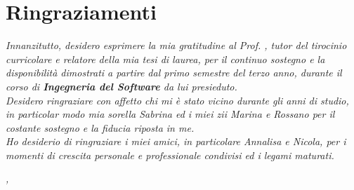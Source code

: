 \cleardoublepage
{}
{}


\bigskip

\begingroup
\let\clearpage\relax
\let\cleardoublepage\relax
\let\cleardoublepage\relax

\chapter*{Ringraziamenti}

\noindent \textit{Innanzitutto, desidero esprimere la mia gratitudine al Prof. \myProf, tutor del tirocinio curricolare e relatore della mia tesi di laurea, per il continuo sostegno e la disponibilità dimostrati a partire dal primo semestre del terzo anno, durante il corso di \textbf{Ingegneria del Software} da lui presieduto.}\\

\noindent \textit{Desidero ringraziare con affetto chi mi è stato vicino durante gli anni di studio, in particolar modo mia sorella Sabrina ed i miei zii Marina e Rossano per il costante sostegno e la fiducia riposta in me.}\\

\noindent \textit{Ho desiderio di ringraziare i miei amici, in particolare Annalisa e Nicola, per i momenti di crescita personale e professionale condivisi ed i legami maturati.}\\
\bigskip

\noindent\textit{\myLocation, \myTime}
\hfill \myName

\endgroup
